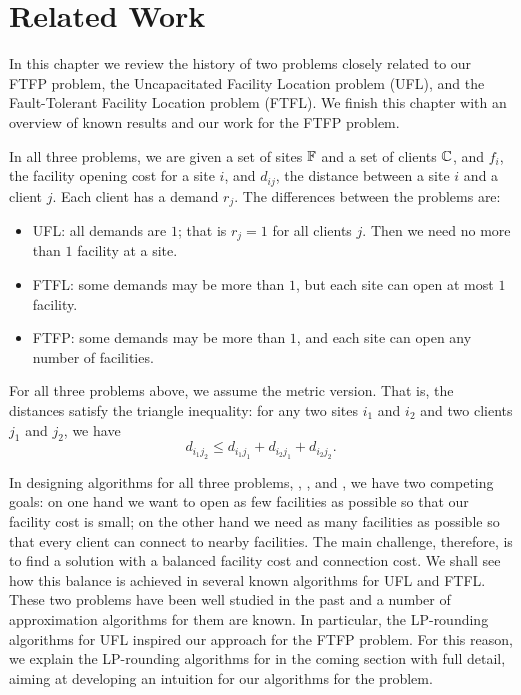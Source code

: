 \documentclass[oneside,final]{ucr}
\begin{document}

\chapter{Related Work} \label{ch: related_work}

In this chapter we review the history of two problems
closely related to our FTFP problem, the Uncapacitated
Facility Location problem (UFL), and the Fault-Tolerant
Facility Location problem (FTFL).  We finish this chapter
with an overview of known results and our work for the FTFP
problem.

In all three problems, we are given a set of sites
$\mathbb{F}$ and a set of clients $\mathbb{C}$, and $f_i$,
the facility opening cost for a site $i$, and $d_{ij}$, the
distance between a site $i$ and a client $j$. Each client
has a demand $r_j$. The differences between the problems
are:
\begin{itemize}
\item{UFL}: all demands are $1$; that is $r_j=1$ for
  all clients $j$. Then we need no more than $1$ facility at
  a site.
\item{FTFL}: some demands may be more than $1$, but
  each site can open at most $1$ facility.
\item{FTFP}: some demands may be more than $1$, and each site
  can open any number of facilities.
\end{itemize}
For all three problems above, we assume the metric
version. That is, the distances satisfy the triangle
inequality: for any two sites $i_1$ and $i_2$ and two
clients $j_1$ and $j_2$, we have
\begin{equation*}
  d_{i_1 j_2} \leq d_{i_1 j_1} + d_{i_2 j_1} + d_{i_2 j_2}.
\end{equation*}

In designing algorithms for all three problems, {\UFL},
{\FTFL}, and {\FTFP}, we have two competing goals: on one
hand we want to open as few facilities as possible so that
our facility cost is small; on the other hand we need as
many facilities as possible so that every client can connect
to nearby facilities. The main challenge, therefore, is to
find a solution with a balanced facility cost and connection
cost. We shall see how this balance is achieved in several
known algorithms for UFL and FTFL. These two problems have
been well studied in the past and a number of approximation
algorithms for them are known. In particular, the
LP-rounding algorithms for UFL inspired our approach for the
FTFP problem. For this reason, we explain the LP-rounding
algorithms for {\UFL} in the coming section with full
detail, aiming at developing an intuition for our algorithms
for the {\FTFP} problem.
\end{document}
